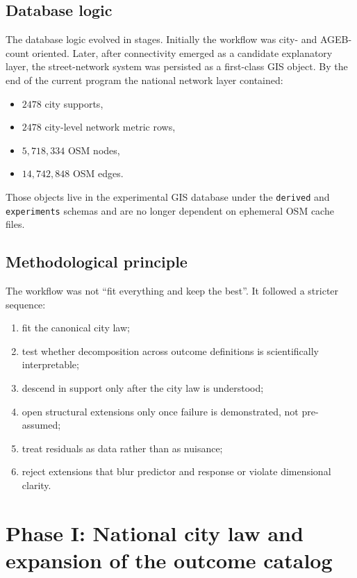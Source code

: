 \documentclass[11pt]{article}
\begin{document}
\subsection{Database logic}

The database logic evolved in stages. Initially the workflow was city- and AGEB-count oriented. Later, after connectivity emerged as a candidate explanatory layer, the street-network system was persisted as a first-class GIS object. By the end of the current program the national network layer contained:
\begin{itemize}
\item \(2478\) city supports,
\item \(2478\) city-level network metric rows,
\item \(5{,}718{,}334\) OSM nodes,
\item \(14{,}742{,}848\) OSM edges.
\end{itemize}

Those objects live in the experimental GIS database under the \texttt{derived} and \texttt{experiments} schemas and are no longer dependent on ephemeral OSM cache files.

\subsection{Methodological principle}

The workflow was not ``fit everything and keep the best''. It followed a stricter sequence:
\begin{enumerate}[label=\arabic*.,leftmargin=2.0em]
\item fit the canonical city law;
\item test whether decomposition across outcome definitions is scientifically interpretable;
\item descend in support only after the city law is understood;
\item open structural extensions only once failure is demonstrated, not pre-assumed;
\item treat residuals as data rather than as nuisance;
\item reject extensions that blur predictor and response or violate dimensional clarity.
\end{enumerate}

\section{Phase I: National city law and expansion of the outcome catalog}
\end{document}
